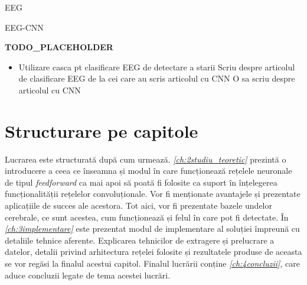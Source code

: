 EEG\cite{eeg:2018}

EEG-CNN\cite{eeg-cnn:2020}

\textbf{TODO\_PLACEHOLDER}
\begin{itemize}
	\item Utilizare casca pt clasificare EEG de detectare a starii
	\subitem Scriu despre articolul de clasificare EEG de la cei care au scris articolul cu CNN
	\subitem O sa scriu despre articolul cu CNN
\end{itemize}
\section{Structurare pe capitole}
Lucrarea este structurată după cum urmează. \textit{\autoref{ch:2studiu_teoretic}} prezintă o introducere a ceea ce înseamna și modul în care funcționează rețelele neuronale de tipul \textit{feedforward} ca mai apoi să poată fi folosite ca suport în înțelegerea funcționalității rețelelor convoluționale. Vor fi menționate avantajele și prezentate aplicațiile de succes ale acestora. Tot aici, vor fi prezentate bazele undelor cerebrale, ce sunt acestea, cum funcționează și felul în care pot fi detectate. În \textit{\autoref{ch:3implementare}} este prezentat modul de implementare al soluției împreună cu detaliile tehnice aferente. Explicarea tehnicilor de extragere și prelucrare a datelor, detalii privind arhitectura rețelei folosite și rezultatele produse de aceasta se vor regăsi la finalul acestui capitol. Finalul lucrării conține \textit{\autoref{ch:4concluzii}}, care aduce concluzii legate de tema acestei lucrări.